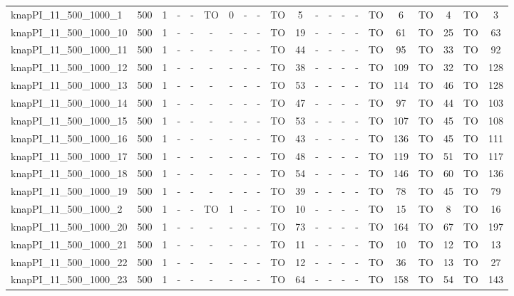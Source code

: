 \begin{sidewaystable}[!ht]
{\begin{tabular}{lcccccccccccccccccccc}
knapPI\_11\_500\_1000\_1 & 500 & 1 &  - &  - & TO & 0 &  - &  - & TO & 5 &  - &  - &  - &  - & TO & 6 & TO & 4 & TO & 3 \\
knapPI\_11\_500\_1000\_10 & 500 & 1 &  - &  - &  - &  - &  - &  - & TO & 19 &  - &  - &  - &  - & TO & 61 & TO & 25 & TO & 63 \\
knapPI\_11\_500\_1000\_11 & 500 & 1 &  - &  - &  - &  - &  - &  - & TO & 44 &  - &  - &  - &  - & TO & 95 & TO & 33 & TO & 92 \\
knapPI\_11\_500\_1000\_12 & 500 & 1 &  - &  - &  - &  - &  - &  - & TO & 38 &  - &  - &  - &  - & TO & 109 & TO & 32 & TO & 128 \\
knapPI\_11\_500\_1000\_13 & 500 & 1 &  - &  - &  - &  - &  - &  - & TO & 53 &  - &  - &  - &  - & TO & 114 & TO & 46 & TO & 128 \\
knapPI\_11\_500\_1000\_14 & 500 & 1 &  - &  - &  - &  - &  - &  - & TO & 47 &  - &  - &  - &  - & TO & 97 & TO & 44 & TO & 103 \\
knapPI\_11\_500\_1000\_15 & 500 & 1 &  - &  - &  - &  - &  - &  - & TO & 53 &  - &  - &  - &  - & TO & 107 & TO & 45 & TO & 108 \\
knapPI\_11\_500\_1000\_16 & 500 & 1 &  - &  - &  - &  - &  - &  - & TO & 43 &  - &  - &  - &  - & TO & 136 & TO & 45 & TO & 111 \\
knapPI\_11\_500\_1000\_17 & 500 & 1 &  - &  - &  - &  - &  - &  - & TO & 48 &  - &  - &  - &  - & TO & 119 & TO & 51 & TO & 117 \\
knapPI\_11\_500\_1000\_18 & 500 & 1 &  - &  - &  - &  - &  - &  - & TO & 54 &  - &  - &  - &  - & TO & 146 & TO & 60 & TO & 136 \\
knapPI\_11\_500\_1000\_19 & 500 & 1 &  - &  - &  - &  - &  - &  - & TO & 39 &  - &  - &  - &  - & TO & 78 & TO & 45 & TO & 79 \\
knapPI\_11\_500\_1000\_2 & 500 & 1 &  - &  - & TO & 1 &  - &  - & TO & 10 &  - &  - &  - &  - & TO & 15 & TO & 8 & TO & 16 \\
knapPI\_11\_500\_1000\_20 & 500 & 1 &  - &  - &  - &  - &  - &  - & TO & 73 &  - &  - &  - &  - & TO & 164 & TO & 67 & TO & 197 \\
knapPI\_11\_500\_1000\_21 & 500 & 1 &  - &  - &  - &  - &  - &  - & TO & 11 &  - &  - &  - &  - & TO & 10 & TO & 12 & TO & 13 \\
knapPI\_11\_500\_1000\_22 & 500 & 1 &  - &  - &  - &  - &  - &  - & TO & 12 &  - &  - &  - &  - & TO & 36 & TO & 13 & TO & 27 \\
knapPI\_11\_500\_1000\_23 & 500 & 1 &  - &  - &  - &  - &  - &  - & TO & 64 &  - &  - &  - &  - & TO & 158 & TO & 54 & TO & 143 \\

\end{tabular}}
\end{sidewaystable}
